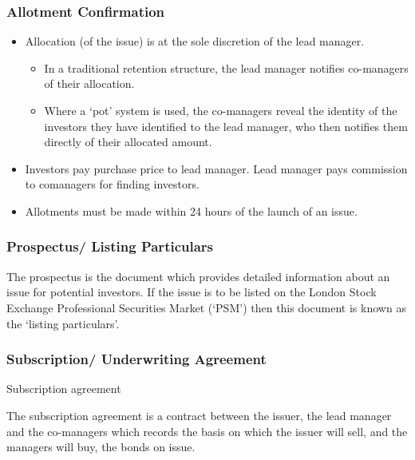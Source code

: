 \documentclass[
]{article}
\providecommand{\tightlist}{%
  \setlength{\itemsep}{0pt}\setlength{\parskip}{0pt}}
\newenvironment{env-2d124ec8-9684-4795-b83a-650d2937997a}
{
    \savenotes\tcolorbox[blanker,breakable,left=5pt,borderline west={2pt}{-4pt}{gold}]
}
{
    \endtcolorbox\spewnotes
}
\begin{document}
\hypertarget{allotment-confirmation}{%
\subsubsection{Allotment Confirmation}\label{allotment-confirmation}}

\begin{itemize}
\tightlist
\item
  Allocation (of the issue) is at the sole discretion of the lead
  manager.

  \begin{itemize}
  \tightlist
  \item
    In a traditional retention structure, the lead manager notifies
    co-managers of their allocation.
  \item
    Where a `pot' system is used, the co-managers reveal the identity of
    the investors they have identified to the lead manager, who then
    notifies them directly of their allocated amount.
  \end{itemize}
\item
  Investors pay purchase price to lead manager. Lead manager pays
  commission to comanagers for finding investors.
\item
  Allotments must be made within 24 hours of the launch of an issue.
\end{itemize}

\hypertarget{prospectus-listing-particulars}{%
\subsubsection{Prospectus/ Listing
Particulars}\label{prospectus-listing-particulars}}

The prospectus is the document which provides detailed information about
an issue for potential investors. If the issue is to be listed on the
London Stock Exchange Professional Securities Market (`PSM') then this
document is known as the `listing particulars'.

\hypertarget{subscription-underwriting-agreement}{%
\subsubsection{Subscription/ Underwriting
Agreement}\label{subscription-underwriting-agreement}}

\begin{env-2d124ec8-9684-4795-b83a-650d2937997a}

Subscription agreement

The subscription agreement is a contract between the issuer, the lead
manager and the co-managers which records the basis on which the issuer
will sell, and the managers will buy, the bonds on issue.

\end{env-2d124ec8-9684-4795-b83a-650d2937997a}
\end{document}
